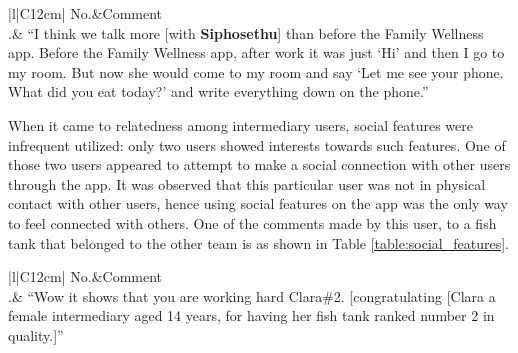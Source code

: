 \begin{table}[h!]
\renewcommand{\baselinestretch}{1.5}
  \begin{center}
    \caption{Excerpt: an example of an increase relatedness between members of a pair.}
    \label{table:related_increase}
	\begin{tabular}{|l|C{12cm}|}
		\hline
		No.&Comment\\
		.& {``I think we talk more [with \textbf{Siphosethu}] than before the Family Wellness app. Before the Family Wellness app, after work it was just `Hi' and then I go to my room. But now she would come to my room  and say `Let me see your phone. What did you eat today?' and write everything down on the phone.''}\\
		\hline
	\end{tabular}
  \end{center}
\end{table} 

When it came to relatedness among intermediary users, social features were infrequent utilized: only two users showed interests towards such features. One of those two users appeared to attempt to make a social connection with other users through the app. It was observed that this particular user was not in physical contact with other users, hence using social features on the app was the only way to feel connected with others. One of the comments made by this user, to a fish tank that belonged to the other team is as shown in Table \ref{table:social_features}.

\begin{table}[h!]
\renewcommand{\baselinestretch}{1.5}
  \begin{center}
    \caption{Excerpt: an example of utilization for social features in the app.}
    \label{table:social_features}
	\begin{tabular}{|l|C{12cm}|}
		\hline
		No.&Comment\\
		.& {``Wow it shows that you are working hard  Clara\#2. [congratulating [Clara a female intermediary aged 14 years, for having her fish tank ranked number 2 in quality.]''}\\
		\hline
	\end{tabular}
  \end{center}
\end{table}    

